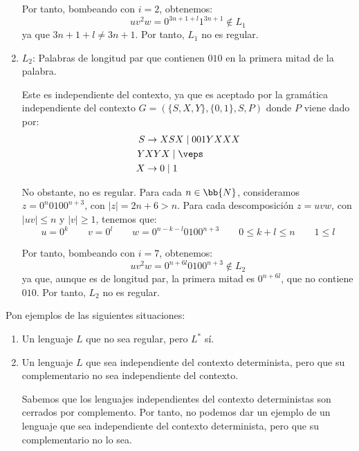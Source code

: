 \documentclass[12pt]{article}
\begin{document}
\begin{ejercicio}[1.25 puntos]
\begin{enumerate}
        Por tanto, bombeando con $i=2$, obtenemos:
        \begin{equation*}
            uv^2w=0^{3n+1+l}1^{3n+1}\notin L_1
        \end{equation*}
        ya que $3n+1+l\neq 3n+1$. Por tanto, $L_1$ no es regular.
        \item $L_2$: Palabras de longitud par que contienen $010$ en la primera mitad de la palabra.
        
        Este es independiente del contexto, ya que es aceptado por la gramática independiente del contexto $G=(\{S,X,Y\}, \{0,1\}, S, P)$ donde $P$ viene dado por:
        \begin{align*}
            S &\rightarrow XSX\mid 001YXXX\\
            Y & XYX \mid \veps\\
            X & \rightarrow 0\mid 1
        \end{align*}

        No obstante, no es regular. Para cada $n\in \bb{N}$, consideramos $z=0^{n}0100^{n+3}$, con $|z|=2n+6>n$. Para cada descomposición $z=uvw$, con $|uv|\leq n$ y $|v|\geq 1$, tenemos que:
        \begin{equation*}
            u=0^k \qquad v=0^l\qquad w=0^{n-k-l}0100^{n+3}
            \qquad 0\leq k+l\leq n \qquad 1\leq l
        \end{equation*}

        Por tanto, bombeando con $i=7$, obtenemos:
        \begin{equation*}
            uv^2w=0^{n+6l}0100^{n+3}\notin L_2
        \end{equation*}
        ya que, aunque es de longitud par, la primera mitad es $0^{n+6l}$, que no contiene $010$. Por tanto, $L_2$ no es regular.
    \end{enumerate}
\end{ejercicio}

\begin{ejercicio}[1.25 puntos]
    Pon ejemplos de las siguientes situaciones:
    \begin{enumerate}
        \item Un lenguaje $L$ que no sea regular, pero $L^*$ sí.
        
        \item Un lenguaje $L$ que sea independiente del contexto determinista, pero que su complementario no sea independiente del contexto.
        
        Sabemos que los lenguajes independientes del contexto deterministas son cerrados por complemento. Por tanto, no podemos dar un ejemplo de un lenguaje que sea independiente del contexto determinista, pero que su complementario no lo sea.
    \end{enumerate}
\end{ejercicio}
\end{document}

